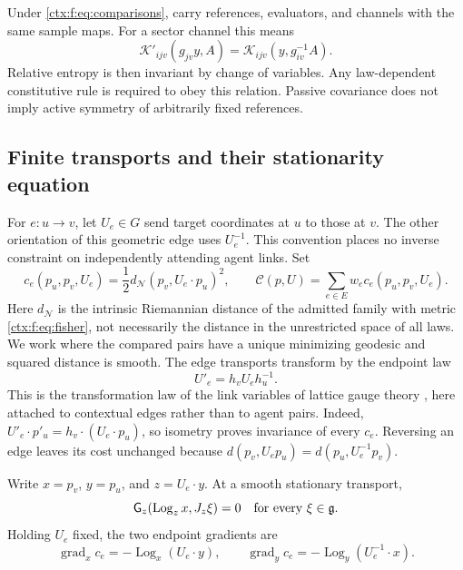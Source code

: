 Under \cref{ctx:f:eq:comparisons}, carry references, evaluators, and channels with the same sample maps. For a sector channel this means
\begin{equation}
 \mathcal K'_{ijv}(g_{jv}y,A)
 =\mathcal K_{ijv}(y,g_{iv}^{-1}A).
\end{equation}
Relative entropy is then invariant by change of variables. Any law-dependent constitutive rule is required to obey this relation. Passive covariance does not imply active symmetry of arbitrarily fixed references.

\subsection{Finite transports and their stationarity equation}

For $e:u\to v$, let $U_e\in G$ send target coordinates at $u$ to those at $v$. The other orientation of this geometric edge uses $U_e^{-1}$. This convention places no inverse constraint on independently attending agent links. Set
\begin{equation}
 c_e(p_u,p_v,U_e)=\frac12 d_{\mathcal N}(p_v,U_e\cdot p_u)^2,
 \qquad
 \mathcal C(p,U)=\sum_{e\in E}w_e c_e(p_u,p_v,U_e).
 \label{ctx:f:eq:C}
\end{equation}
Here $d_{\mathcal N}$ is the intrinsic Riemannian distance of the admitted family with metric \cref{ctx:f:eq:fisher}, not necessarily the distance in the unrestricted space of all laws. We work where the compared pairs have a unique minimizing geodesic and squared distance is smooth. The edge transports transform by the endpoint law
\begin{equation}
 U'_e=h_vU_eh_u^{-1}.
 \label{ctx:f:eq:endpoint}
\end{equation}
This is the transformation law of the link variables of lattice gauge theory \cite{Wilson1974}, here attached to contextual edges rather than to agent pairs. Indeed, $U'_e\cdot p'_u=h_v\cdot(U_e\cdot p_u)$, so isometry proves invariance of every $c_e$. Reversing an edge leaves its cost unchanged because
$d(p_v,U_ep_u)=d(p_u,U_e^{-1}p_v)$.

Write $x=p_v$, $y=p_u$, and $z=U_e\cdot y$. At a smooth stationary transport,
\begin{equation}
 \mathsf G_z(\operatorname{Log}_z x,J_z\xi)=0
 \quad\hbox{for every }\xi\in\mathfrak g.
 \label{ctx:f:eq:stationarity}
\end{equation}
Holding $U_e$ fixed, the two endpoint gradients are
\begin{equation}
 \operatorname{grad}_x c_e=-\operatorname{Log}_x(U_e\cdot y),\qquad
 \operatorname{grad}_y c_e=-\operatorname{Log}_y(U_e^{-1}\cdot x).
 \label{ctx:f:eq:endpointgrad}
\end{equation}

